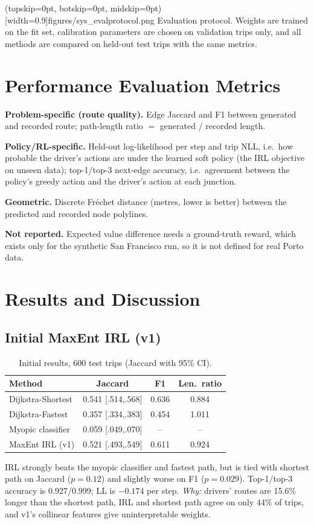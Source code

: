 \documentclass{ieeeaccess}
\begin{document}
\Figure[t!](topskip=0pt, botskip=0pt, midskip=0pt)[width=0.9\textwidth]{figures/sys_evalprotocol.png}
{Evaluation protocol. Weights are trained on the fit set, calibration parameters are chosen on validation trips only, and all methods are compared on held-out test trips with the same metrics.\label{fig:eval}}

\section{Performance Evaluation Metrics}\label{sec:metrics}
\textbf{Problem-specific (route quality).} Edge Jaccard and F1 between generated and recorded route; path-length ratio $=$ generated / recorded length.

\textbf{Policy/RL-specific.} Held-out log-likelihood per step and trip NLL, i.e.\ how probable the driver's actions are under the learned soft policy (the IRL objective on unseen data); top-1/top-3 next-edge accuracy, i.e.\ agreement between the policy's greedy action and the driver's action at each junction.

\textbf{Geometric.} Discrete Fr\'echet distance (metres, lower is better) between the predicted and recorded node polylines.

\textbf{Not reported.} Expected value difference needs a ground-truth reward, which exists only for the synthetic San Francisco run, so it is not defined for real Porto data.

\section{Results and Discussion}\label{sec:results}
\subsection{Initial MaxEnt IRL (v1)}
\begin{table}[t]
\centering\footnotesize
\caption{Initial results, 600 test trips (Jaccard with 95\% CI).}\label{tab:v1}
\begin{tabular}{@{}lccc@{}}
\toprule
Method & Jaccard & F1 & Len.\ ratio\\
\midrule
Dijkstra-Shortest & 0.541 [.514,.568] & 0.636 & 0.884\\
Dijkstra-Fastest & 0.357 [.334,.383] & 0.454 & 1.011\\
Myopic classifier & 0.059 [.049,.070] & -- & --\\
MaxEnt IRL (v1) & 0.521 [.493,.549] & 0.611 & 0.924\\
\bottomrule
\end{tabular}
\end{table}
IRL strongly beats the myopic classifier and fastest path, but is tied with shortest path on Jaccard ($p=0.12$) and slightly worse on F1 ($p=0.029$). Top-1/top-3 accuracy is 0.927/0.999; LL is $-0.174$ per step. \emph{Why:} drivers' routes are 15.6\% longer than the shortest path, IRL and shortest path agree on only 44\% of trips, and v1's collinear features give uninterpretable weights.
\end{document}
